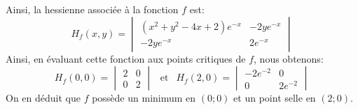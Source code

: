 {\begin{enumerate}
{Ainsi, la hessienne associée à la fonction $f$ est:
$$H_f(x,y) = \begin{vmatrix} 
(x^2+y^2-4x+2) e^{-x} & -2y e^{-x} \\
-2y e^{-x} & 2 e^{-x} \end{vmatrix}$$
Ainsi, en évaluant cette fonction aux points critiques de $f$, nous obtenons: 
$$ 
H_f(0,0) = \begin{vmatrix} 
2 & 0 \\ 0 & 2 \end{vmatrix} ~~\text{ et }~~
H_f(2,0) = \begin{vmatrix} 
-2 e^{-2} & 0 \\ 0 & 2e^{-2} \end{vmatrix} $$
On en déduit que $f$ possède un minimum en $(0;0)$ et un point selle en $(2;0)$. 

}
\end{enumerate}

}